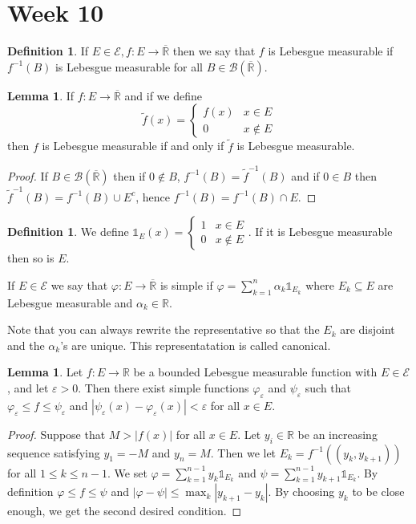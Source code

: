\documentclass{article}
\newcommand{\R}{\mathbb{R}}
\newcommand{\cl}[1]{\overline{#1}}
\theoremstyle{definition} %
\numberwithin{thm}{section} %
\newtheorem{lemma}[thm]{Lemma}
\theoremstyle{definition} %
\newtheorem{defn}[thm]{Definition}
\begin{document}
\section{Week 10}

\begin{defn}
    If $E \in \mathcal{E}, f: E \to \cl{\R}$ then we say that $f$ is Lebesgue measurable if $f^{-1}(B)$ is Lebesgue measurable for all $B \in \mathcal{B}(\cl{\R})$.
\end{defn}

\begin{lemma}
    If $f: E \to \cl{\R}$ and if we define
    \[
        \tilde{f}(x) = \begin{cases}
            f(x) & x \in E \\
            0 & x \notin E
        \end{cases}  
    \]
    then $f$ is Lebesgue measurable if and only if $\tilde{f}$ is Lebesgue measurable.
\end{lemma}
\begin{proof}
If $B \in \mathcal{B}(\cl{\R})$ then if $0 \notin B$, $f^{-1}(B) = \tilde{f}^{-1}(B)$ and if $0 \in B$ then $\tilde{f}^{-1}(B) = f^{-1}(B) \cup E^c$, hence $f^{-1}(B) = f^{-1}(B) \cap E$.
\end{proof}

\begin{defn}
    We define $\mathds{1}_E(x) = \begin{cases}
        1 & x \in E \\ 0 & x \notin E
    \end{cases}$. If it is Lebesgue measurable then so is $E$.

    If $E \in \mathcal{E}$ we say that $\varphi: E \to \cl{\R}$ is simple if $\varphi = \sum_{k = 1}^n \alpha_k \mathds{1}_{E_k}$ where $E_k \subseteq E$ are Lebesgue measurable and $\alpha_k \in \R$. 
    
    Note that you can always rewrite the representative so that the $E_k$ are disjoint and the $\alpha_k$'s are unique. This representatation is called canonical.
\end{defn}

\begin{lemma}
    Let $f: E \to \R$ be a bounded Lebesgue measurable function with $E \in \mathcal{E}$, and let $\varepsilon > 0$. Then there exist simple functions $\varphi_\varepsilon$ and $\psi_\varepsilon$ such that $\varphi_\varepsilon \leq f \leq \psi_\varepsilon$ and $|\psi_\varepsilon(x) - \varphi_{\varepsilon}(x)| < \varepsilon$ for all $x \in E$. 
\end{lemma}
\begin{proof}
Suppose that $M > |f(x)|$ for all $x \in E$. Let $y_i \in \R$ be an increasing sequence satisfying $y_1 = -M$ and $y_n = M$. Then we let $E_k = f^{-1}((y_k, y_{k + 1}))$ for all $1 \leq k \leq n - 1$. We set $\varphi = \sum_{k = 1}^{n - 1} y_k\mathds{1}_{E_k}$ and $\psi = \sum_{k = 1}^{n - 1} y_{k + 1}\mathds{1}_{E_k}$. By definition $\varphi \leq f \leq \psi$ and $|\varphi - \psi| \leq \max_k|y_{k + 1} - y_k|$. By choosing $y_k$ to be close enough, we get the second desired condition.
\end{proof}
\end{document}
